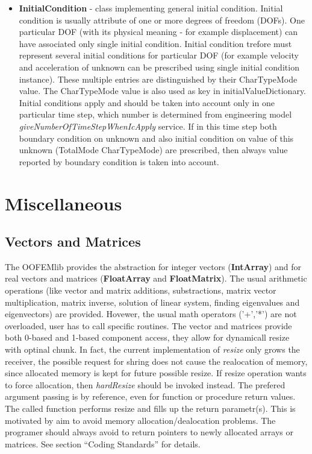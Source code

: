 \documentclass[12pt,draft]{article}
\newcommand{\class}[1]{{\bf #1}}
\newcommand{\service}[1]{{\em #1}}
\newcommand{\attribute}[1]{#1}
\begin{document}
\begin{itemize}
\item
\class{InitialCondition} - class implementing general initial condition. Initial condition is usually attribute of
one or more degrees of freedom (DOFs). One particular DOF (with its
physical meaning - for example displacement) can have associated only
single initial condition.	Initial condition trefore must represent
several initial conditions for particular DOF (for example velocity
and acceleration of unknown can be prescribed using single initial
condition instance). These multiple entries are distinguished by their
CharTypeMode value.	The CharTypeMode value is also used as key in
\attribute{initialValueDictionary}.
Initial conditions apply and should be taken into account	only in one
particular time step, which number is determined from engineering
model	\service{giveNumberOfTimeStepWhenIcApply} service. If in this
time step both boundary condition on unknown and also initial
condition on value of this unknown (TotalMode CharTypeMode) are
prescribed, then always value reported by boundary condition is taken
into account.
\end{itemize}

\section{Miscellaneous}
\subsection{Vectors and Matrices}
The OOFEMlib provides the abstraction for integer vectors (\class{IntArray})
and for real vectors and matrices (\class{FloatArray} and
\class{FloatMatrix}). The usual arithmetic operations (like vector and
matrix additions, substractions, matrix vector multiplication, matrix
inverse, solution of linear system, finding eigenvalues and
eigenvectors) are provided. Hovewer, the usual math operators ('+','*')
are not overloaded, user has to call specific routines. 
The vector and matrices provide both 0-based and 1-based component
access, they allow for dynamicall resize with optinal chunk. In fact,
the current implementation of \service{resize} only grows the
receiver, the possible request for shring does not cause the
realocation of memory, since allocated memory is kept for future possible resize. If
resize operation wants to force allocation, then \service{hardResize}
should be invoked instead. 
The prefered argument passing is by reference, even for function or
procedure return values.
The called function performs resize and fills up
the return parametr(s). This is motivated by aim to avoid memory
allocation/dealocation problems. The programer should always avoid to
return pointers to newly allocated arrays or matrices. 
See section ``Coding Standards'' for
details.
\end{document}
